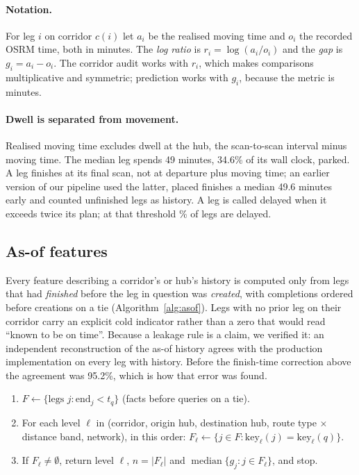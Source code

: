 \paragraph{Notation.} For leg $i$ on corridor $c(i)$ let $a_i$ be the realised moving time and $o_i$ the recorded OSRM time, both in minutes. The \emph{log ratio} is $r_i=\log(a_i/o_i)$ and the \emph{gap} is $g_i=a_i-o_i$. The corridor audit works with $r_i$, which makes comparisons multiplicative and symmetric; prediction works with $g_i$, because the metric is minutes.

\paragraph{Dwell is separated from movement.} Realised moving time excludes dwell at the hub, the scan-to-scan interval minus moving time. The median leg spends 49 minutes, 34.6\% of its wall clock, parked. A leg finishes at its final scan, not at departure plus moving time; an earlier version of our pipeline used the latter, placed finishes a median 49.6 minutes early and counted unfinished legs as history. A leg is called delayed when it exceeds twice its plan; at that threshold \fzPctDelayedDpOne{}\% of legs are delayed.

\subsection{As-of features}\label{sec:asof}
Every feature describing a corridor's or hub's history is computed only from legs that had \emph{finished} before the leg in question was \emph{created}, with completions ordered before creations on a tie (Algorithm~\ref{alg:asof}). Legs with no prior leg on their corridor carry an explicit cold indicator rather than a zero that would read ``known to be on time''. Because a leakage rule is a claim, we verified it: an independent reconstruction of the as-of history agrees with the production implementation on every leg with history. Before the finish-time correction above the agreement was 95.2\%, which is how that error was found.

\begin{algorithm}[t]
\caption{As-of history for a query leg $q$ created at time $t_q$ (hierarchical back-off)}
\label{alg:asof}
\begin{enumerate}
\item[1.] $F \leftarrow \{\text{legs } j : \text{end}_j < t_q\}$ (facts before queries on a tie).
\item[2.] For each level $\ell$ in (corridor, origin hub, destination hub, route type $\times$ distance band, network), in this order: $F_\ell \leftarrow \{j \in F : \text{key}_\ell(j)=\text{key}_\ell(q)\}$.
\item[3.] If $F_\ell \neq \emptyset$, return level $\ell$, $n=|F_\ell|$ and $\operatorname{median}\{g_j : j\in F_\ell\}$, and stop.
\end{enumerate}
\end{algorithm}
